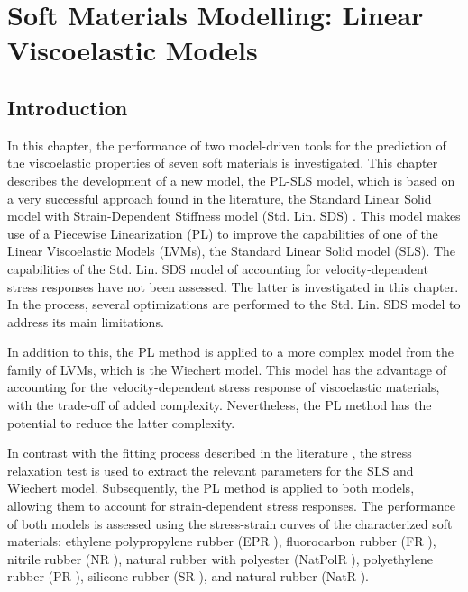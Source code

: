 \chapter{Soft Materials Modelling: Linear Viscoelastic Models} \label{sec:ChapterModellingLVM}


\section{Introduction}

In this chapter, the performance of two model-driven tools for the prediction of the viscoelastic properties of seven soft materials is investigated. This chapter describes the development of a new model, the PL-SLS model, which is based on a very successful approach found in the literature, the Standard Linear Solid model with Strain-Dependent Stiffness model (Std. Lin. SDS) \cite{austin2015control}. This model makes use of a Piecewise Linearization (PL) to improve the capabilities of one of the Linear Viscoelastic Models (LVMs), the Standard Linear Solid model (SLS). The capabilities of the Std. Lin. SDS model of accounting for velocity-dependent stress responses have not been assessed. The latter is investigated in this chapter. In the process, several optimizations are performed to the Std. Lin. SDS model to address its main limitations.

In addition to this, the PL method is applied to a more complex model from the family of LVMs, which is the Wiechert model. This model has the advantage of accounting for the velocity-dependent stress response of viscoelastic materials, with the trade-off of added complexity. Nevertheless, the PL method has the potential to reduce the latter complexity.

In contrast with the fitting process described in the literature \cite{austin2015control}, the stress relaxation test is used to extract the relevant parameters for the SLS and Wiechert model. Subsequently, the PL method is applied to both models, allowing them to account for strain-dependent stress responses. The performance of both models is assessed using the stress-strain curves of the characterized soft materials: ethylene polypropylene rubber (EPR \cite{EPRubber2019}), fluorocarbon rubber (FR \cite{FRubber2019}), nitrile rubber (NR \cite{NRubber2019}), natural rubber with polyester (NatPolR \cite{NatPolRubber2019}), polyethylene  rubber  (PR \cite{PRubber2019}), silicone  rubber  (SR \cite{SRubber2019}), and natural rubber (NatR \cite{NatRubber2019}).

